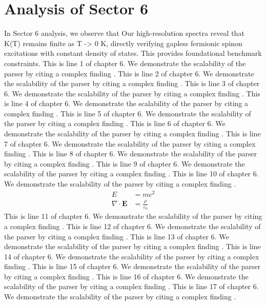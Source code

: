\chapter{Analysis of Sector 6}

In Sector 6 analysis, we observe that Our high-resolution spectra reveal that K(T) remains finite as T -> 0 K, directly verifying gapless fermionic spinon excitations with constant density of states. This provides foundational benchmark constraints.
This is line 1 of chapter 6. We demonstrate the scalability of the parser by citing a complex finding \cite{ref6_1}.
This is line 2 of chapter 6. We demonstrate the scalability of the parser by citing a complex finding \cite{ref6_2}.
This is line 3 of chapter 6. We demonstrate the scalability of the parser by citing a complex finding \cite{ref6_3}.
This is line 4 of chapter 6. We demonstrate the scalability of the parser by citing a complex finding \cite{ref6_4}.
This is line 5 of chapter 6. We demonstrate the scalability of the parser by citing a complex finding \cite{ref6_5}.
This is line 6 of chapter 6. We demonstrate the scalability of the parser by citing a complex finding \cite{ref6_6}.
This is line 7 of chapter 6. We demonstrate the scalability of the parser by citing a complex finding \cite{ref6_7}.
This is line 8 of chapter 6. We demonstrate the scalability of the parser by citing a complex finding \cite{ref6_8}.
This is line 9 of chapter 6. We demonstrate the scalability of the parser by citing a complex finding \cite{ref6_9}.
This is line 10 of chapter 6. We demonstrate the scalability of the parser by citing a complex finding \cite{ref6_10}.
\begin{align*}
  E &= mc^2 \\
  \nabla \cdot \mathbf{E} &= \frac{\rho}{\varepsilon_0}
\end{align*}
This is line 11 of chapter 6. We demonstrate the scalability of the parser by citing a complex finding \cite{ref6_11}.
This is line 12 of chapter 6. We demonstrate the scalability of the parser by citing a complex finding \cite{ref6_12}.
This is line 13 of chapter 6. We demonstrate the scalability of the parser by citing a complex finding \cite{ref6_13}.
This is line 14 of chapter 6. We demonstrate the scalability of the parser by citing a complex finding \cite{ref6_14}.
This is line 15 of chapter 6. We demonstrate the scalability of the parser by citing a complex finding \cite{ref6_15}.
This is line 16 of chapter 6. We demonstrate the scalability of the parser by citing a complex finding \cite{ref6_16}.
This is line 17 of chapter 6. We demonstrate the scalability of the parser by citing a complex finding \cite{ref6_17}.
